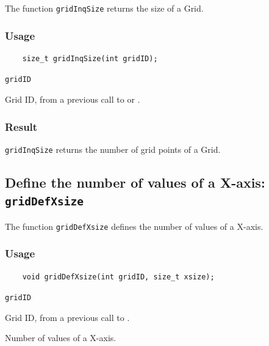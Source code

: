 The function {\texttt{gridInqSize}} returns the size of a Grid.

\subsubsection*{Usage}

\begin{verbatim}
    size_t gridInqSize(int gridID);
\end{verbatim}

\hspace*{4mm}\begin{minipage}[]{15cm}
\begin{deflist}{\texttt{gridID}\ }
\item[\texttt{gridID}]
Grid ID, from a previous call to {} or {}.

\end{deflist}
\end{minipage}

\subsubsection*{Result}

{\texttt{gridInqSize}} returns the number of grid points of a Grid.



\subsection{Define the number of values of a X-axis: \texttt{gridDefXsize}}
\label{gridDefXsize}

The function {\texttt{gridDefXsize}} defines the number of values of a X-axis.

\subsubsection*{Usage}

\begin{verbatim}
    void gridDefXsize(int gridID, size_t xsize);
\end{verbatim}

\hspace*{4mm}\begin{minipage}[]{15cm}
\begin{deflist}{\texttt{gridID}\ }
\item[\texttt{gridID}]
Grid ID, from a previous call to {}.
\item[\texttt{xsize}]
Number of values of a X-axis.

\end{deflist}
\end{minipage}



